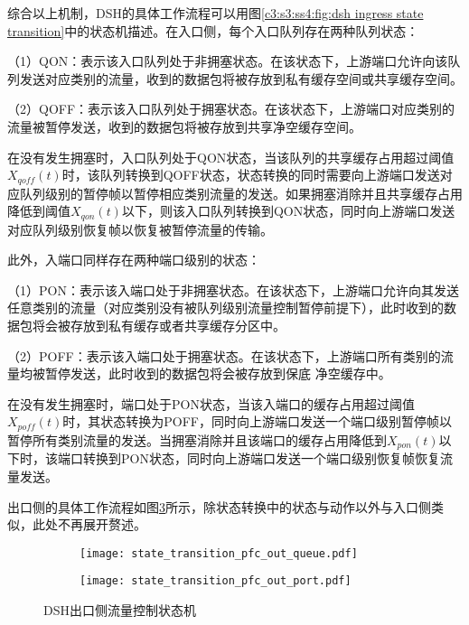 综合以上机制，DSH的具体工作流程可以用图\ref{c3:s3:ss4:fig:dsh ingress state transition}中的状态机描述。在入口侧，每个入口队列存在两种队列状态：

（1）QON：表示该入口队列处于非拥塞状态。在该状态下，上游端口允许向该队列发送对应类别的流量，收到的数据包将被存放到私有缓存空间或共享缓存空间。

（2）QOFF：表示该入口队列处于拥塞状态。在该状态下，上游端口对应类别的流量被暂停发送，收到的数据包将被存放到共享净空缓存空间。

在没有发生拥塞时，入口队列处于QON状态，当该队列的共享缓存占用超过阈值$X_{\mathit{qoff}}(t)$时，该队列转换到QOFF状态，状态转换的同时需要向上游端口发送对应队列级别的暂停帧以暂停相应类别流量的发送。如果拥塞消除并且共享缓存占用降低到阈值$X_{qon}(t)$以下，则该入口队列转换到QON状态，同时向上游端口发送对应队列级别恢复帧以恢复被暂停流量的传输。

此外，入端口同样存在两种端口级别的状态：

\setcounter{paragraph}{0}
（1）PON：表示该入端口处于非拥塞状态。在该状态下，上游端口允许向其发送任意类别的流量（对应类别没有被队列级别流量控制暂停前提下），此时收到的数据包将会被存放到私有缓存或者共享缓存分区中。

（2）POFF：表示该入端口处于拥塞状态。在该状态下，上游端口所有类别的流量均被暂停发送，此时收到的数据包将会被存放到保底 净空缓存中。

在没有发生拥塞时，端口处于PON状态，当该入端口的缓存占用超过阈值$X_{\mathit{poff}}(t)$时，其状态转换为POFF，同时向上游端口发送一个端口级别暂停帧以暂停所有类别流量的发送。当拥塞消除并且该端口的缓存占用降低到$X_{pon}(t)$以下时，该端口转换到PON状态，同时向上游端口发送一个端口级别恢复帧恢复流量发送。

出口侧的具体工作流程如图\ref{c3:s3:ss4:fig:dsh egress flow control}所示，除状态转换中的状态与动作以外与入口侧类似，此处不再展开赘述。

\begin{figure}[H]
  \begin{subfigure}[b]{0.49\linewidth}
      \centering
      \texttt{[image: state\_transition\_pfc\_out\_queue.pdf]}
      \label{c3:s3:ss4:fig:sub1:dsh egress queue state transition}
  \end{subfigure}
  \begin{subfigure}[b]{0.49\linewidth}
      \centering
      \texttt{[image: state\_transition\_pfc\_out\_port.pdf]}
      \label{c3:s3:ss4:fig:sub2:dsh egress port state transition}
  \end{subfigure}
  \caption{DSH出口侧流量控制状态机}
  \label{c3:s3:ss4:fig:dsh egress flow control}
\end{figure}


